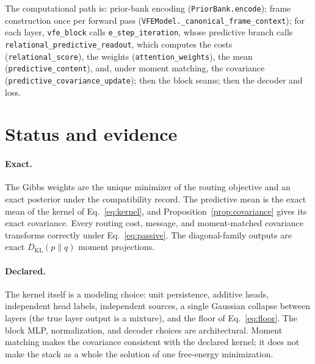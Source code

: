 \documentclass[11pt]{article}
\theoremstyle{definition}
\theoremstyle{remark}
\newcommand{\KL}{D_{\mathrm{KL}}}
\newcommand{\cfg}[1]{\texttt{#1}}
\begin{document}
\sloppy
The computational path is: prior-bank encoding (\cfg{PriorBank.encode}); frame construction once per forward pass (\cfg{VFEModel.\_canonical\_frame\_context}); for each layer, \cfg{vfe\_block} calls \cfg{e\_step\_iteration}, whose predictive branch calls \cfg{relational\_predictive\_readout}, which computes the costs (\cfg{relational\_score}), the weights (\cfg{attention\_weights}), the mean (\cfg{predictive\_content}), and, under moment matching, the covariance (\cfg{predictive\_covariance\_update}); then the block seams; then the decoder and loss.

\section{Status and evidence}
\label{sec:status}

\paragraph{Exact.}
The Gibbs weights are the unique minimizer of the routing objective and an exact posterior under the compatibility record. The predictive mean is the exact mean of the kernel of Eq.~\eqref{eq:kernel}, and Proposition~\ref{prop:covariance} gives its exact covariance. Every routing cost, message, and moment-matched covariance transforms correctly under Eq.~\eqref{eq:passive}. The diagonal-family outputs are exact $\KL(p\|q)$ moment projections.

\paragraph{Declared.}
The kernel itself is a modeling choice: unit persistence, additive heads, independent head labels, independent sources, a single Gaussian collapse between layers (the true layer output is a mixture), and the floor of Eq.~\eqref{eq:floor}. The block MLP, normalization, and decoder choices are architectural. Moment matching makes the covariance consistent with the declared kernel; it does not make the stack as a whole the solution of one free-energy minimization.
\end{document}
